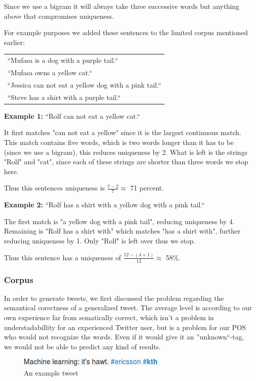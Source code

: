 \documentclass[a4paper,12pt]{article}
\begin{document}
Since we use a bigram it will always take three successive words but anything above that compromises uniqueness.

For example purposes we added these sentences to the limited corpus mentioned earlier:

\begin{tabular}{l}
``Mufasa is a dog with a purple tail.``\\
``Mufasa owns a yellow cat.``\\
``Jessica can not eat a yellow dog with a pink tail.``\\
``Steve has a shirt with a purple tail.``\\
\end{tabular}

\textbf{Example 1:} ``Rolf can not eat a yellow cat.``
	
It first matches "can not eat a yellow" since it is the largest continuous match. This match contains five words, which is two words longer than it has to be (since we use a bigram), this reduces uniqueness by 2. What is left is the strings "Rolf" and "cat", since each of these strings are shorter than three words we stop here.

Thus this sentences uniqueness is $\frac{7 - 2}{7} \approx$ 71 percent.

\textbf{Example 2:} ``Rolf has a shirt with a yellow dog with a pink tail.``
	
The first match is "a yellow dog with a pink tail", reducing uniqueness by 4. Remaining is "Rolf has a shirt with" which matches "has a shirt with", further reducing uniqueness by 1. Only "Rolf" is left over thus we stop. 

Thus this sentence has a uniqueness of $\frac{12 - (4 + 1)}{12} \approx$ 58\%.

\subsubsection{Corpus}
In order to generate tweets, we first discussed the problem regarding the semantical corectness of a generalized tweet.
The average level is according to our own experience far from sematically correct, which isn't a problem in understadabillity for an experienced Twitter user,
but is a problem for our POS who would not recognize the words. Even if it would give it an ''unknown``-tag, we would not be able to predict any kind of results.

\begin{figure}[h!]
  \centering
  \includegraphics[width=0.75\linewidth]{machine_learning}
  \caption{An example tweet}
\end{figure}
\end{document}
